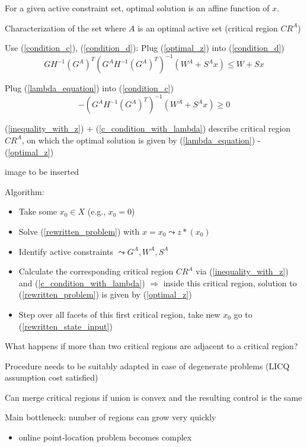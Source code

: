 For a given active constraint set, optimal solution is an affine function of $x$.

Characterization of the set where $A$ is an optimal active set (critical region $CR^A$)

Use (\ref{condition_c}), (\ref{condition_d}): Plug (\ref{optimal_z}) into (\ref{condition_d})
\begin{equation}\label{inequality_with_z}
GH^{-1}(G^A)^T(G^AH^{-1}(G^A)^T)^{-1}(W^A+S^Ax) \leq W + Sx
\end{equation}

Plug (\ref{lambda_equation}) into (\ref{condition_c})
\begin{equation}\label{c_condition_with_lambda}
-(G^AH^{-1}(G^A)^T)^{-1}(W^A+S^Ax) \geq 0
\end{equation}

(\ref{inequality_with_z}) + (\ref{c_condition_with_lambda}) describe critical region $CR^A$, on which the optimal solution is given by (\ref{lambda_equation}) -(\ref{optimal_z})

image to be inserted

Algorithm:
\begin{itemize}
\item Take some $x_0 \in X$ (e.g., $x_0 = 0$)
\item Solve (\ref{rewritten_problem}) with $x = x_0 \leadsto z*(x_0)$
\item Identify active constraints $\leadsto G^A, W^A, S^A$
\item Calculate the corresponding critical region $CR^A$ via (\ref{inequality_with_z}) and (\ref{c_condition_with_lambda})
$\Rightarrow$ inside this critical region, solution to (\ref{rewritten_problem}) is given by (\ref{optimal_z})
\item Step over all facets of this first critical region, take new $x_0$ go to (\ref{rewritten_state_input})
\end{itemize}  

What happens if more than two critical regions are adjacent to a critical region?

Procedure needs to be suitably adapted in case of degenerate problems (LICQ assumption cost satisfied)

Can merge critical regions if union is convex and the resulting control is the same

Main bottleneck: number of regions can grow very quickly
\begin{itemize}
\item online point-location problem becomes complex
\end{itemize}

